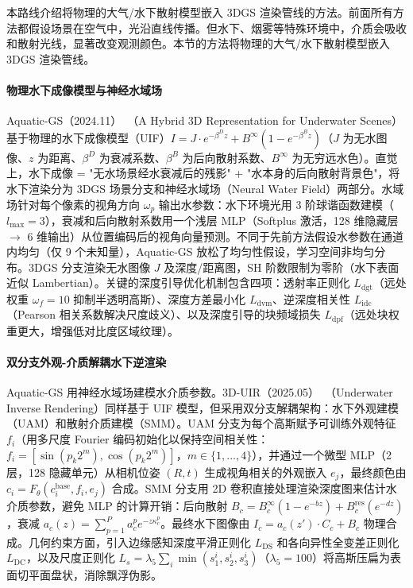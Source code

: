 本路线介绍将物理的大气/水下散射模型嵌入 3DGS 渲染管线的方法。前面所有方法都假设场景在空气中，光沿直线传播。但水下、烟雾等特殊环境中，介质会吸收和散射光线，显著改变观测颜色。本节的方法将物理的大气/水下散射模型嵌入 3DGS 渲染管线。

\paragraph{物理水下成像模型与神经水域场}

Aquatic-GS（2024.11）~\cite{2411_00239}（A Hybrid 3D Representation for Underwater Scenes）基于物理的水下成像模型（UIF）$I = J \cdot e^{-\beta^D z} + B^\infty(1-e^{-\beta^B z})$（$J$ 为无水图像、$z$ 为距离、$\beta^D$ 为衰减系数、$\beta^B$ 为后向散射系数、$B^\infty$ 为无穷远水色）。直觉上，水下成像 = "无水场景经水衰减后的残影" + "水本身的后向散射背景色"，将水下渲染分为 3DGS 场景分支和神经水域场（Neural Water Field）两部分。水域场针对每个像素的视角方向 $\omega_p$ 输出水参数：水下环境光用 3 阶球谐函数建模（$l_{\max}=3$），衰减和后向散射系数用一个浅层 MLP（Softplus 激活，128 维隐藏层 $\to$ 6 维输出）从位置编码后的视角向量预测。不同于先前方法假设水参数在通道内均匀（仅 9 个未知量），Aquatic-GS 放松了均匀性假设，学习空间非均匀分布。3DGS 分支渲染无水图像 $J$ 及深度/距离图，SH 阶数限制为零阶（水下表面近似 Lambertian）。关键的深度引导优化机制包含四项：透射率正则化 $L_{\text{dgt}}$（远处权重 $\omega_f=10$ 抑制半透明高斯）、深度方差最小化 $L_{\text{dvm}}$、逆深度相关性 $L_{\text{idc}}$（Pearson 相关系数解决尺度歧义）、以及深度引导的块频域损失 $L_{\text{dpf}}$（远处块权重更大，增强低对比度区域纹理）。

\paragraph{双分支外观-介质解耦水下逆渲染}

Aquatic-GS 用神经水域场建模水介质参数。3D-UIR（2025.05）~\cite{2505_21238}（Underwater Inverse Rendering）同样基于 UIF 模型，但采用双分支解耦架构：水下外观建模（UAM）和散射介质建模（SMM）。UAM 分支为每个高斯赋予可训练外观特征 $f_i$（用多尺度 Fourier 编码初始化以保持空间相关性：$f_i = [\sin(p_k 2^m), \cos(p_k 2^m)]$，$m \in \{1,...,4\}$），并通过一个微型 MLP（2 层，128 隐藏单元）从相机位姿 $(R,t)$ 生成视角相关的外观嵌入 $e_j$，最终颜色由 $c_i = F_\theta(c_i^{\text{base}}, f_i, e_j)$ 合成。SMM 分支用 2D 卷积直接处理渲染深度图来估计水介质参数，避免 MLP 的计算开销：后向散射 $B_c = B_c^\infty(1-e^{-bz}) + B_c^{\text{res}}(e^{-dz})$，衰减 $a_c(z) = \sum_{p=1}^{P} a_c^p e^{-z\kappa_c^p}$。最终水下图像由 $I_c = a_c(z') \cdot C_c + B_c$ 物理合成。几何约束方面，引入边缘感知深度平滑正则化 $L_{\text{DS}}$ 和各向异性全变差正则化 $L_{\text{DC}}$，以及尺度正则化 $L_s = \lambda_5 \sum_i \min(s_1^i, s_2^i, s_3^i)$（$\lambda_5=100$）将高斯压扁为表面切平面盘状，消除飘浮伪影。

